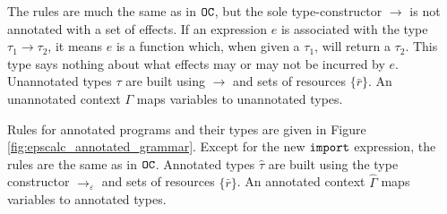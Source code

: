 The rules are much the same as in $\mathtt{OC}$, but the sole type-constructor $\rightarrow$ is not annotated with a set of effects. If an expression $e$ is associated with the type $\tau_1 \rightarrow \tau_2$, it means $e$ is a function which, when given a $\tau_1$, will return a $\tau_2$. This type says nothing about what effects may or may not be incurred by $e$. Unannotated types $\tau$ are built using $\rightarrow$ and sets of resources $\{ \bar r \}$. An unannotated context $\Gamma$ maps variables to unannotated types.

Rules for annotated programs and their types are given in Figure \ref{fig:epscalc_annotated_grammar}. Except for the new $\mathtt{import}$ expression, the rules are the same as in $\mathtt{OC}$. Annotated types $\hat \tau$ are built using the type constructor $\rightarrow_{\varepsilon}$ and sets of resources $\{ \bar r \}$. An annotated context $\hat \Gamma$ maps variables to annotated types.


